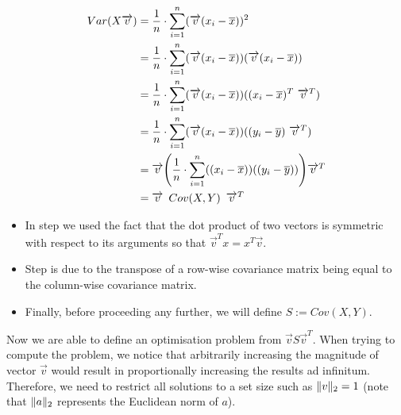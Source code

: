 \vspace{-25mm}
{
\begin{align}
	\label{formula:maxVarI}
	Var(X\overrightarrow{v}) &= \frac{1}{n} \cdot \displaystyle\sum_{i=1}^{n} (\overrightarrow{v}(x_i-\overline{x}))^2
	\\
	\label{formula:maxVarII}
	&= \frac{1}{n} \cdot \displaystyle\sum_{i=1}^{n} (\overrightarrow{v}(x_i-\overline{x})) (\overrightarrow{v}(x_i-\overline{x}))
	\\
	\label{formula:maxVarIII}
	&= \frac{1}{n} \cdot \displaystyle\sum_{i=1}^{n} (\overrightarrow{v}(x_i-\overline{x})) ((x_i-\overline{x})^T \ \overrightarrow{v}^T)
	\\
	\label{formula:maxVarIV}
	&= \frac{1}{n} \cdot \displaystyle\sum_{i=1}^{n} (\overrightarrow{v}(x_i-\overline{x})) ((y_i-\overline{y}) \ \overrightarrow{v}^T)
	\\
	\label{formula:maxVarV}
	&= \overrightarrow{v} \Bigg(\frac{1}{n} \cdot \displaystyle\sum_{i=1}^{n} ((x_i-\overline{x})) ((y_i-\overline{y}))\Bigg) \overrightarrow{v}^T
	\\
	\label{formula:maxVarVI}
	&= \overrightarrow{v} \enskip Cov(X,Y) \enskip \overrightarrow{v}^T
\end{align}
}

\vspace{-16mm}

\begin{itemize}
	\item In step  we used the fact that the dot product of two vectors is symmetric with respect to its arguments so that $\overrightarrow{v}^T x = x^T\overrightarrow{v}$.
	\item Step  is due to the transpose of a row-wise covariance matrix being equal to the column-wise covariance matrix.
	\item Finally, before proceeding any further, we will define $S := Cov(X,Y)$.
\end{itemize}


\clearpage

Now we are able to define an optimisation problem from $\overrightarrow{v} S \overrightarrow{v}^T$.
When trying to compute the problem, we notice that arbitrarily increasing the magnitude of vector $\overrightarrow{v}$ would result in proportionally increasing the results ad infinitum.
Therefore, we need to restrict all solutions to a set size such as $\lVert v\rVert_2 = 1$ (note that $\lVert a\rVert_2$ represents the Euclidean norm of $a$).

